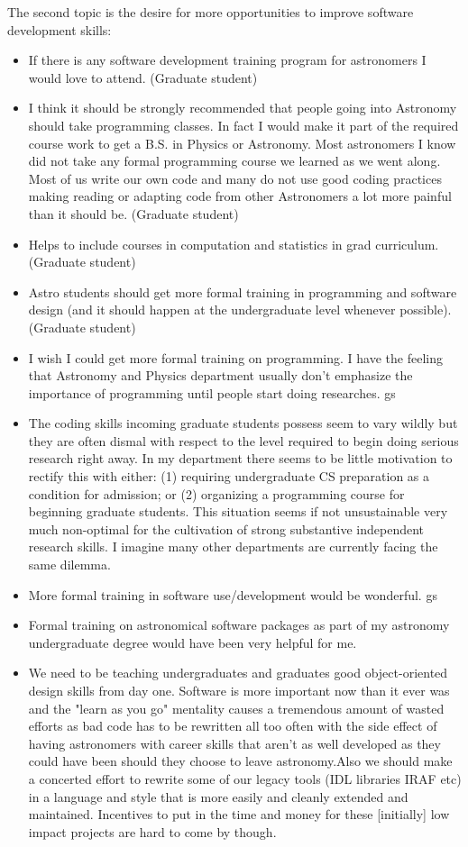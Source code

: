 The second topic is the desire for more opportunities to improve software development skills:
\begin{itemize}
\item{If there is any software development training program for astronomers I would love to attend. (Graduate student)}
\item{I think it should be strongly recommended that people going into Astronomy should take programming classes. In fact I would make it part of the required course work to get a B.S. in Physics or Astronomy. Most astronomers I know did not take any formal programming course we learned as we went along. Most of us write our own code and many do not use good coding practices making reading or adapting code from other Astronomers a lot more painful than it should be. (Graduate student)}
\item{Helps to include courses in computation and statistics in grad curriculum. (Graduate student)}
\item{Astro students should get more formal training in programming and software design (and it should happen at the undergraduate level whenever possible). (Graduate student)}
\item{I wish I could get more formal training on programming. I have the feeling that Astronomy and Physics department usually don't emphasize the importance of programming until people start doing researches. gs}
\item{The coding skills incoming graduate students possess seem to vary wildly but they are often dismal with respect to the level required to begin doing serious research right away. In my department there seems to be little motivation to rectify this with either: (1) requiring undergraduate CS preparation as a condition for admission; or (2) organizing a programming course for beginning graduate students. This situation seems if not unsustainable very much non-optimal for the cultivation of strong substantive independent research skills. I imagine many other departments are currently facing the same dilemma.}
\item{More formal training in software use/development would be wonderful. gs}
\item{Formal training on astronomical software packages as part of my astronomy undergraduate degree would have been very helpful for me.}
\item{We need to be teaching undergraduates and graduates good object-oriented design skills from day one. Software is more important now than it ever was and the "learn as you go" mentality causes a tremendous amount of wasted efforts as bad code has to be rewritten all too often with the side effect of having astronomers with career skills that aren't as well developed as they could have been should they choose to leave astronomy.Also we should make a concerted effort to rewrite some of our legacy tools (IDL libraries IRAF etc) in a language and style that is more easily and cleanly extended and maintained. Incentives to put in the time and money for these [initially] low impact projects are hard to come by though.}

\end{itemize}

